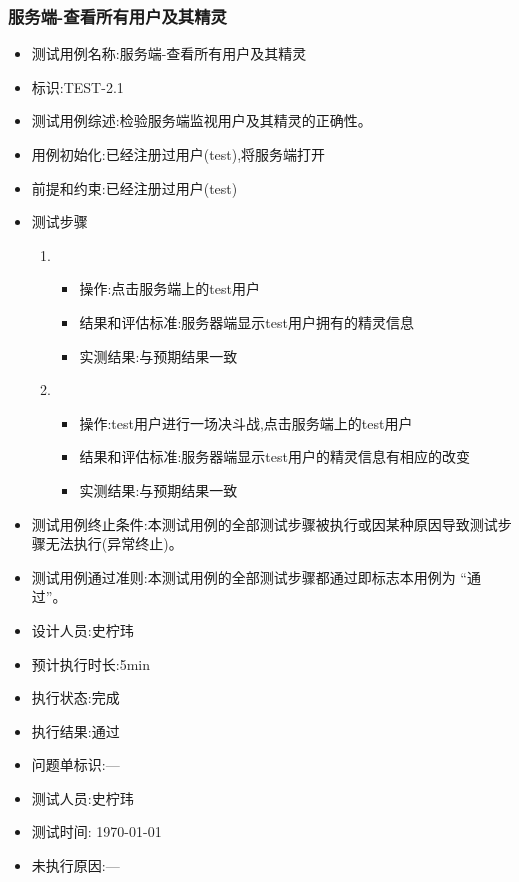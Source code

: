 \documentclass{article}
\begin{document}
\subsubsection{服务端-查看所有用户及其精灵}
\begin{itemize}
\item 测试用例名称:服务端-查看所有用户及其精灵
\item 标识:TEST-2.1
\item 测试用例综述:检验服务端监视用户及其精灵的正确性。
\item 用例初始化:已经注册过用户(test),将服务端打开
\item 前提和约束:已经注册过用户(test)
\item 测试步骤
  \begin{enumerate}
  \item
    \begin{itemize}
    \item 操作:点击服务端上的test用户
    \item 结果和评估标准:服务器端显示test用户拥有的精灵信息
    \item 实测结果:与预期结果一致
    \end{itemize}
  \item
    \begin{itemize}
    \item 操作:test用户进行一场决斗战,点击服务端上的test用户
    \item 结果和评估标准:服务器端显示test用户的精灵信息有相应的改变
    \item 实测结果:与预期结果一致
    \end{itemize}
  \end{enumerate}
\item 测试用例终止条件:本测试用例的全部测试步骤被执行或因某种原因导致测试步骤无法执行(异常终止)。
\item 测试用例通过准则:本测试用例的全部测试步骤都通过即标志本用例为 “通过”。
\item 设计人员:史柠玮
\item 预计执行时长:5min
\item 执行状态:完成
\item 执行结果:通过
\item 问题单标识:---
\item 测试人员:史柠玮
\item 测试时间: \today
\item 未执行原因:---
\end{itemize}
\end{document}
